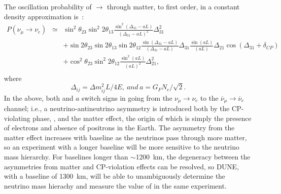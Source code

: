 The oscillation probability of \numu $\rightarrow$ \nue through matter, 
to first order, in a constant density
approximation is~\cite{Nunokawa:2007qh}:
%
\begin{eqnarray}
\label{eq:oscprob}
P(\nu_\mu \rightarrow \nu_e) & \simeq & \sin^2 \theta_{23} \sin^2 2 \theta_{13} 
\frac{ \sin^2(\Delta_{31} - aL)}{(\Delta_{31}-aL)^2} \Delta_{31}^2\\ \nonumber
& & + \sin 2 \theta_{23} \sin 2 \theta_{13} \sin 2 \theta_{12} \frac{ \sin(\Delta_{31} - aL)}{(\Delta_{31}-aL)} \Delta_{31} \frac{\sin(aL)}{(aL)} \Delta_{21} \cos (\Delta_{31} + \delta_{CP})\\ \nonumber
& & + \cos^2 \theta_{23} \sin^2 2 \theta_{12} \frac {\sin^2(aL)}{(aL)^2} \Delta_{21}^2, \\ \nonumber
\end{eqnarray}
%
where 
  \[ \Delta_{ij} = \Delta m^2_{ij} L/4E,\ and \ a=G_F N_e /\sqrt{2}. \]
%
In the above, both \deltacp and $a$ 
switch signs in going from the
$\nu_\mu \to \nu_e$ to the $\overline{\nu}_\mu \to \overline{\nu}_e$ channel; i.e.,
a neutrino-antineutrino asymmetry is introduced both by the CP-violating
phase, \deltacp, and the matter effect, the origin of which 
is simply the presence of electrons and absence of positrons in the Earth.  
The asymmetry from the matter effect increases with baseline as the neutrinos
pass through more matter, so an experiment with a longer baseline will be
more sensitive to the neutrino mass hierarchy. For baselines longer than 
$\sim$1200~km, the degeneracy between the asymmetries from matter
and CP-violation effects can be resolved, so DUNE, with a baseline of 1300~km, 
will be able to unambiguously
determine the neutrino mass hierachy and measure the value of \deltacp in the same experiment.

